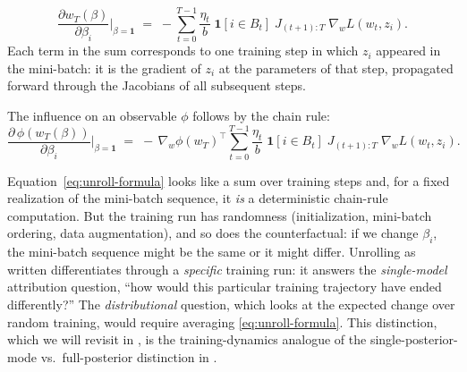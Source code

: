\documentclass[11pt]{article}
\begin{document}
\begin{equation}\label{eq:unroll-formula}
  \boxed{\;\frac{\partial w_T(\beta)}{\partial \beta_i}\bigg\rvert_{\beta=\mathbf{1}} \;=\; -\sum_{t=0}^{T-1}\frac{\eta_t}{b}\;\mathbf{1}[i\in B_t]\;J_{(t+1):T}\;\nabla_w L(w_t,z_i).\;}
\end{equation}
Each term in the sum corresponds to one training step in which $z_i$ appeared in the mini-batch: it is the gradient of $z_i$ at the parameters of that step, propagated forward through the Jacobians of all subsequent steps.

The influence on an observable $\phi$ follows by the chain rule:
\begin{equation}\label{eq:unroll-influence}
  \frac{\partial\,\phi(w_T(\beta))}{\partial \beta_i}\bigg\rvert_{\beta=\mathbf{1}} \;=\; -\,\nabla_w\phi(w_T)^\top\sum_{t=0}^{T-1}\frac{\eta_t}{b}\;\mathbf{1}[i\in B_t]\;J_{(t+1):T}\;\nabla_w L(w_t,z_i).
\end{equation}

\begin{remark}\label{rem:unroll-vs-if}
Equation~\eqref{eq:unroll-formula} looks like a sum over training steps and, for a fixed realization of the mini-batch sequence, it \emph{is} a deterministic chain-rule computation. But the training run has randomness (initialization, mini-batch ordering, data augmentation), and so does the counterfactual: if we change $\beta_i$, the mini-batch sequence might be the same or it might differ. Unrolling as written differentiates through a \emph{specific} training run: it answers the \emph{single-model} attribution question, ``how would this particular training trajectory have ended differently?''\! The \emph{distributional} question, which looks at the expected change over random training, would require averaging \eqref{eq:unroll-formula}. This distinction, which we will revisit in , is the training-dynamics analogue of the single-posterior-mode vs.\ full-posterior distinction in .
\end{remark}
\end{document}
